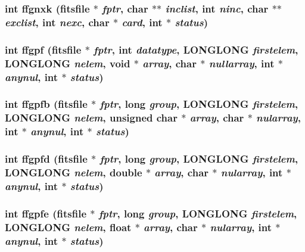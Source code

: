 \subsubsection{\setlength{\rightskip}{0pt plus 5cm}int ffgnxk (\bf{fitsfile} $\ast$ {\em fptr}, char $\ast$$\ast$ {\em inclist}, int {\em ninc}, char $\ast$$\ast$ {\em exclist}, int {\em nexc}, char $\ast$ {\em card}, int $\ast$ {\em status})}\label{src_2fitsio_8h_19ff4531fbaa18e5979fb079215ad5ce}


\subsubsection{\setlength{\rightskip}{0pt plus 5cm}int ffgpf (\bf{fitsfile} $\ast$ {\em fptr}, int {\em datatype}, \bf{LONGLONG} {\em firstelem}, \bf{LONGLONG} {\em nelem}, void $\ast$ {\em array}, char $\ast$ {\em nullarray}, int $\ast$ {\em anynul}, int $\ast$ {\em status})}\label{src_2fitsio_8h_fd98f4b7e140059770ec7fa0396a5b46}


\subsubsection{\setlength{\rightskip}{0pt plus 5cm}int ffgpfb (\bf{fitsfile} $\ast$ {\em fptr}, long {\em group}, \bf{LONGLONG} {\em firstelem}, \bf{LONGLONG} {\em nelem}, unsigned char $\ast$ {\em array}, char $\ast$ {\em nularray}, int $\ast$ {\em anynul}, int $\ast$ {\em status})}\label{src_2fitsio_8h_b3ed324412e62cb24a95691ab0ab7bb1}


\subsubsection{\setlength{\rightskip}{0pt plus 5cm}int ffgpfd (\bf{fitsfile} $\ast$ {\em fptr}, long {\em group}, \bf{LONGLONG} {\em firstelem}, \bf{LONGLONG} {\em nelem}, double $\ast$ {\em array}, char $\ast$ {\em nularray}, int $\ast$ {\em anynul}, int $\ast$ {\em status})}\label{src_2fitsio_8h_f07b2a21749be57deb75f5b64431f653}


\subsubsection{\setlength{\rightskip}{0pt plus 5cm}int ffgpfe (\bf{fitsfile} $\ast$ {\em fptr}, long {\em group}, \bf{LONGLONG} {\em firstelem}, \bf{LONGLONG} {\em nelem}, float $\ast$ {\em array}, char $\ast$ {\em nularray}, int $\ast$ {\em anynul}, int $\ast$ {\em status})}\label{src_2fitsio_8h_1a079011790bd529d65496708911d743}


